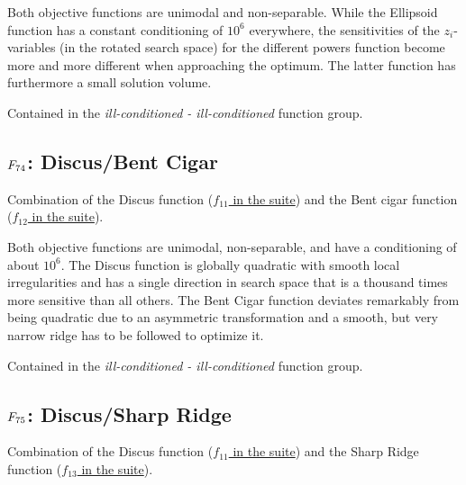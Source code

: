 Both objective functions are unimodal and non-separable. While the
Ellipsoid function has a constant conditioning of \(10^6\) everywhere,
the sensitivities of the \(z_i\)-variables (in the rotated search space)
for the different powers function become more and more different when
approaching the optimum. The latter function has furthermore a small
solution volume.

Contained in the \emph{ill-conditioned - ill-conditioned} function group.



\subsection[\texorpdfstring{\protect\(F_{74}\protect\): Discus/Bent Cigar}{F74: Discus/Bent Cigar}]{\texorpdfstring{\protect\(F_{74}\protect\): Discus/Bent Cigar}{}}
\label{index:f74}\label{index:discus-bent-cigar}
Combination of the Discus function (\href{https://coco.gforge.inria.fr/downloads/download16.00/bbobdocfunctions.pdf\#page=55}{\(f_{11}\) in the \bbob suite}) and the
Bent cigar function (\href{https://coco.gforge.inria.fr/downloads/download16.00/bbobdocfunctions.pdf\#page=60}{\(f_{12}\) in the \bbob suite}).

Both objective functions are unimodal, non-separable, and have a conditioning
of about \(10^6\).
The Discus function is globally quadratic with smooth local irregularities
and has a single direction in search space that is a thousand times more
sensitive than all others. The Bent Cigar function deviates remarkably
from being quadratic due to an asymmetric transformation and a smooth,
but very narrow ridge has to be followed to optimize it.

Contained in the \emph{ill-conditioned - ill-conditioned} function group.



\subsection[\texorpdfstring{\protect\(F_{75}\protect\): Discus/Sharp Ridge}{F75: Discus/Sharp Ridge}]{\texorpdfstring{\protect\(F_{75}\protect\): Discus/Sharp Ridge}{}}
\label{index:discus-sharp-ridge}\label{index:f75}
Combination of the Discus function (\href{https://coco.gforge.inria.fr/downloads/download16.00/bbobdocfunctions.pdf\#page=55}{\(f_{11}\) in the \bbob suite}) and the
Sharp Ridge function (\href{https://coco.gforge.inria.fr/downloads/download16.00/bbobdocfunctions.pdf\#page=65}{\(f_{13}\) in the \bbob suite}).

